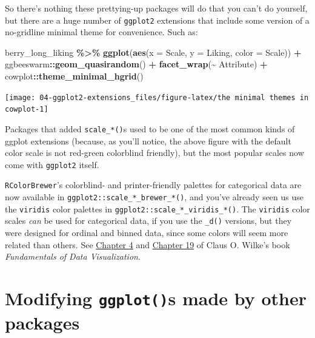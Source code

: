 \documentclass[
]{book}
\newenvironment{Shaded}{\begin{snugshade}}{\end{snugshade}}
\newcommand{\AttributeTok}[1]{\textcolor[rgb]{0.13,0.29,0.53}{#1}}
\newcommand{\FunctionTok}[1]{\textcolor[rgb]{0.13,0.29,0.53}{\textbf{#1}}}
\newcommand{\NormalTok}[1]{#1}
\newcommand{\SpecialCharTok}[1]{\textcolor[rgb]{0.81,0.36,0.00}{\textbf{#1}}}
\begin{document}
So there's nothing these prettying-up packages will do that you can't do yourself, but there are a huge number of \texttt{ggplot2} extensions that include some version of a no-gridline minimal theme for convenience. Such as:

\begin{Shaded}
\begin{Highlighting}[]
\NormalTok{berry\_long\_liking }\SpecialCharTok{\%\textgreater{}\%}
  \FunctionTok{ggplot}\NormalTok{(}\FunctionTok{aes}\NormalTok{(}\AttributeTok{x =}\NormalTok{ Scale, }\AttributeTok{y =}\NormalTok{ Liking, }\AttributeTok{color =}\NormalTok{ Scale)) }\SpecialCharTok{+}
\NormalTok{  ggbeeswarm}\SpecialCharTok{::}\FunctionTok{geom\_quasirandom}\NormalTok{() }\SpecialCharTok{+}
  \FunctionTok{facet\_wrap}\NormalTok{(}\SpecialCharTok{\textasciitilde{}}\NormalTok{ Attribute) }\SpecialCharTok{+}
\NormalTok{  cowplot}\SpecialCharTok{::}\FunctionTok{theme\_minimal\_hgrid}\NormalTok{()}
\end{Highlighting}
\end{Shaded}

\begin{center}\texttt{[image: 04-ggplot2-extensions\_files/figure-latex/the minimal themes in cowplot-1]} \end{center}

Packages that added \texttt{scale\_*()}s used to be one of the most common kinds of ggplot extensions (because, as you'll notice, the above figure with the default color scale is not red-green colorblind friendly), but the most popular scales now come with \texttt{ggplot2} itself.

\texttt{RColorBrewer}'s colorblind- and printer-friendly palettes for categorical data are now available in \texttt{ggplot2::scale\_*\_brewer\_*()}, and you've already seen us use the \texttt{viridis} color palettes in \texttt{ggplot2::scale\_*\_viridis\_*()}. The \texttt{viridis} color scales \emph{can} be used for categorical data, if you use the \texttt{\_d()} versions, but they were designed for ordinal and binned data, since some colors will seem more related than others. See \href{https://clauswilke.com/dataviz/color-basics.html}{Chapter 4} and \href{https://clauswilke.com/dataviz/color-pitfalls.html}{Chapter 19} of Claus O. Wilke's book \emph{Fundamentals of Data Visualization}.

\hypertarget{modifying-ggplots-made-by-other-packages}{%
\section{\texorpdfstring{Modifying \texttt{ggplot()}s made by other packages}{Modifying ggplot()s made by other packages}}\label{modifying-ggplots-made-by-other-packages}}
\end{document}
